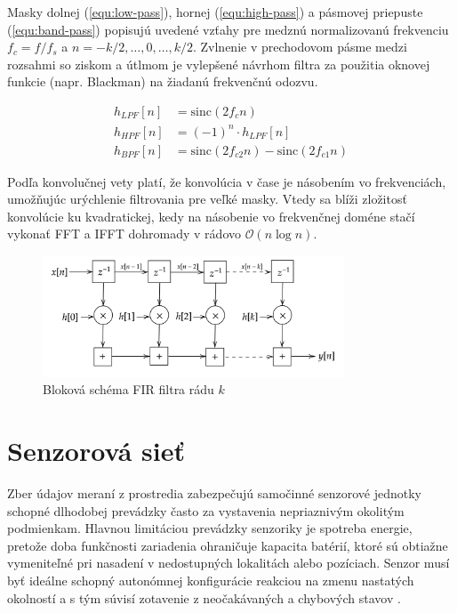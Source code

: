 Masky dolnej (\ref{equ:low-pass}), hornej (\ref{equ:high-pass}) a pásmovej priepuste (\ref{equ:band-pass}) popisujú
uvedené vzťahy pre medznú normalizovanú frekvenciu $f_c = f / f_s$ a $n = -k/2, \dots, 0, \dots, k/2$. Zvlnenie v prechodovom pásme
medzi rozsahmi so ziskom a útlmom je vylepšené návrhom filtra za použitia oknovej funkcie (napr. Blackman) na žiadanú
frekvenčnú odozvu.
\begin{ceqn}\begin{align}
h_{LPF}[n] &= \mathrm{sinc}(2 f_c n)  \label{equ:low-pass} \\
h_{HPF}[n] &= (-1)^n \cdot h_{LPF}[n] \label{equ:high-pass} \\
h_{BPF}[n] &= \mathrm{sinc}(2 f_{c2} n) -  \mathrm{sinc}(2 f_{c1} n)  \label{equ:band-pass}
\end{align}\end{ceqn}

Podľa konvolučnej vety platí, že konvolúcia v čase je násobením vo frekvenciách, umožňujúc urýchlenie filtrovania
pre veľké masky. Vtedy sa blíži zložitosť konvolúcie ku kvadratickej, kedy na násobenie vo frekvenčnej doméne
stačí vykonať FFT a IFFT dohromady v rádovo $\mathcal{O}(n \log n)$.

\begin{figure}[h]
	\centering
	\includegraphics[width=0.8\textwidth]{figures/analysis/fir-filter.png}
	\caption{Bloková schéma FIR filtra rádu $k$}
	\label{fig:fir-filter}
\end{figure}

\section{Senzorová sieť}
Zber údajov meraní z prostredia zabezpečujú samočinné senzorové jednotky schopné dlhodobej prevádzky
často za vystavenia nepriaznivým okolitým podmienkam. Hlavnou limitáciou prevádzky senzoriky je spotreba energie,
pretože doba funkčnosti zariadenia ohraničuje kapacita batérií, ktoré sú obtiažne vymeniteľné pri nasadení
v nedostupných lokalitách alebo pozíciach. Senzor musí byť ideálne schopný autonómnej konfigurácie
reakciou na zmenu nastatých okolností a s tým súvisí zotavenie z neočakávaných a chybových stavov \cite{wsn-overview}.

